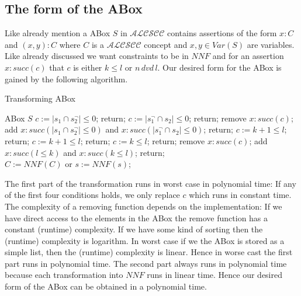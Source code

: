 \documentclass[a4paper,11pt]{scrartcl}
\theoremstyle{break}
\theoremstyle{definition}
\begin{document}
\subsection{The form of the ABox}
Like already mention a ABox $S$ in $\mathcal{ALCSCC}$ contains assertions of the form $x:C$ and $(x,y):C$ where $C$ is a $\mathcal{ALCSCC}$ concept and $x,y\in Var(S)$ are variables. Like already discussed we want constraints to be in $NNF$ and for an assertion $x:succ(c)$ that $c$ is either $k\leq l$ or $n\,dvd\,l$.
Our desired form for the ABox is gained by the following algorithm.
\begin{algorithm}[H] \caption{Transforming ABox}
\begin{algorithmic}[l]
\State ABox $S$
\State $c:=|s_1\cap s_2^\neg|\leq 0$; return;
\EndIf
{}
\State $c:=|s_1^\neg\cap s_2|\leq 0$; return;
\EndIf
{}
\State remove $x:succ(c)$;
\State add $x:succ(|s_1\cap s_2^\neg|\leq 0)$ and $x:succ(|s_1^\neg\cap s_2|\leq 0)$; return;
\EndIf
{}
\State $c:=k +1\leq l$; return;
\EndIf
{}
\State $c:=k +1\leq l$; return;
\EndIf
{}
\State $c:=k\leq l$; return;
\EndIf
{}
\State remove $x:succ(c)$;
\State add $x:succ(l\leq k)$ and $x:succ(k\leq l)$; return;
\EndIf
\EndFor\\
\State $C:=NNF(C)$ or $s:=NNF(s)$;
\EndFor
\end{algorithmic}
\end{algorithm}
The first part of the transformation runs in worst case in polynomial time: If any of the first four conditions holds, we only replace $c$ which runs in constant time.  The complexity of a removing function depends on the implementation: If we have direct access to the elements in the ABox the remove function has a constant (runtime) complexity. If we have some kind of sorting then the (runtime) complexity is logarithm. In worst case if we the ABox is stored as a simple list, then the (runtime) complexity is linear. Hence in worse cast the first part runs in polynomial time. The second part always runs in polynomial time because each transformation into $NNF$ runs in linear time. Hence our desired form of the ABox can be obtained in a polynomial time.
\end{document}
